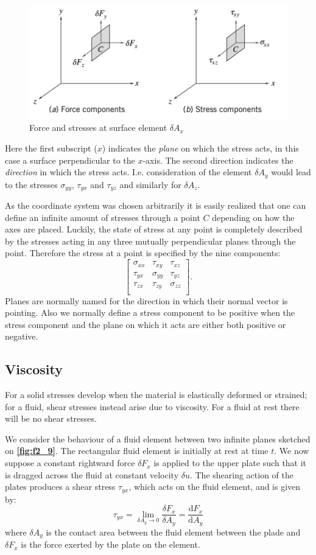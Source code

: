 \begin{figure} [ht]
  \centering
  \includegraphics[width=0.5\linewidth]{./figures/f2_7.png}
  \caption{Force and stresses at surface element $\delta A_x$}
  \label{fig:f2_7}
\end{figure}

Here the first subscript ($x$) indicates the \textit{plane} on which the stress acts, in this case a surface perpendicular to the $x$-axis. The second direction indicates the \textit{direction} in which the stress acts. I.e. consideration of the element $\delta A_y$ would lead to the stresses $\sigma_{yy}$, $\tau_{yx}$ and $\tau_{yz}$ and similarly for $\delta A_{z}$. 

As the coordinate system was chosen arbitrarily it is easily realized that one can define an infinite amount of stresses through a point $C$ depending on how the axes are placed. Luckily, the state of stress at any point is completely described by the stresses acting in any three mutually perpendicular planes through the point. Therefore the stress at a point is specified by the nine components:
\[ 
\begin{bmatrix}
\sigma_{x x} & \tau_{xy} & \tau_{xz}\\
\tau_{yx} & \sigma_{yy} & \tau_{yz}\\
\tau_{z x} & \tau_{zy} & \sigma_{zz}\\
\end{bmatrix}
.\]
Planes are normally named for the direction in which their normal vector is pointing. Also we normally define a stress component to be positive when the stress component and the plane on which it acts are either both positive or negative.

\subsection{Viscosity}
For a solid stresses develop when the material is elastically deformed or strained; for a fluid, shear stresses instead arise due to viscosity. For a fluid at rest there will be no shear stresses.

We consider the behaviour of a fluid element between two infinite planes sketched on \textbf{\autoref{fig:f2_9}}. The rectangular fluid element is initially at rest at time $t$. We now suppose a constant rightward force $\delta F_x$ is applied to the upper plate such that it is dragged across the fluid at constant velocity $\delta u$. The shearing action of the plates produces a shear stress $\tau_{yx}$, which acts on the fluid element, and is given by:
\[ 
\tau_{yx} = \lim_{\delta A_y \to 0} \frac{\delta F_x}{\delta A_y} = \frac{\mathrm{d} F_x}{\mathrm{d}A_y} 
\]
where $\delta A_y$ is the contact area between the fluid element between the plade and $\delta F_x$ is the force exerted by the plate on the element.

